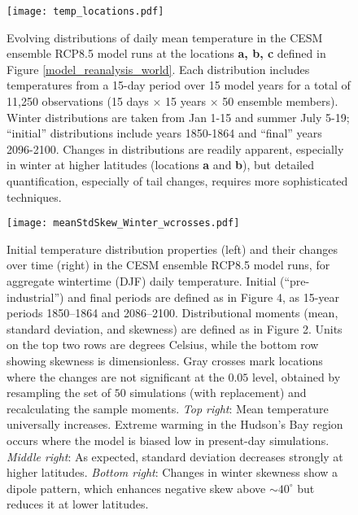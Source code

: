 \documentclass{ametsoc}
\newcommand\smallfigwidth{\columnwidth}
\begin{document}

\begin{figure}[ht]
\centerline{\texttt{[image: temp\_locations.pdf]}}
\caption{\small{Evolving distributions of daily mean temperature in the CESM ensemble RCP8.5 model runs at the locations \textbf{a, b, c} defined in Figure \ref{model_reanalysis_world}.  Each distribution includes temperatures from a 15-day period over 15 model years for a total of 11,250 observations (15 days $\times$ 15 years $\times$ 50 ensemble members). Winter distributions %
are taken from Jan 1-15 and summer July 5-19;  ``initial'' distributions include years 1850-1864 and ``final'' years 2096-2100. Changes in distributions are readily apparent, especially in winter at higher latitudes (locations \textbf{a} and \textbf{b}), but detailed quantification, especially of tail changes, requires more sophisticated techniques.}}
\label{location_distributions}
\end{figure}

\begin{figure}[ht]
\centerline{\texttt{[image: meanStdSkew\_Winter\_wcrosses.pdf]}}
\caption{\small{Initial temperature distribution properties (left) and their changes over time (right) in the CESM ensemble RCP8.5 model runs, for aggregate wintertime (DJF) daily temperature. Initial (``pre-industrial'') and final periods are defined as in Figure 4, as 15-year periods 1850--1864 and 2086--2100.  Distributional moments (mean, standard deviation, and skewness) are defined as in Figure 2. Units on the top two rows are degrees Celsius, while the bottom row showing skewness is dimensionless. Gray crosses mark locations where the changes are not significant at the $0.05$ level, obtained by resampling the set of $50$ simulations (with replacement) and recalculating the sample moments. \emph{Top right}: Mean temperature universally increases. Extreme warming in the Hudson's Bay region occurs where the model is biased low in present-day simulations. \emph{Middle right}: As expected, standard deviation decreases strongly at higher latitudes. \emph{Bottom right}: Changes in winter skewness show a dipole pattern, which enhances negative skew above $\sim 40 ^\circ$ but reduces it at lower latitudes. }}
\label{meanStdSkew_Winter}
\end{figure}
\end{document}
